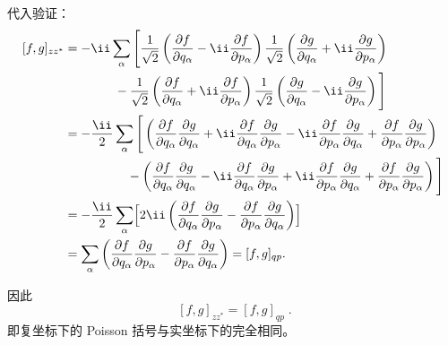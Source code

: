 \begin{question}
\begin{solution}
代入验证：
\[
\begin{aligned}
[f,g]_{zz^*}
&= -\ii\sum_{\alpha}\Bigg[
\frac{1}{\sqrt2}\left(\frac{\partial f}{\partial q_\alpha}
-\ii\frac{\partial f}{\partial p_\alpha}\right)
\frac{1}{\sqrt2}\left(\frac{\partial g}{\partial q_\alpha}
+\ii\frac{\partial g}{\partial p_\alpha}\right) \\
&\qquad\qquad
-\frac{1}{\sqrt2}\left(\frac{\partial f}{\partial q_\alpha}
+\ii\frac{\partial f}{\partial p_\alpha}\right)
\frac{1}{\sqrt2}\left(\frac{\partial g}{\partial q_\alpha}
-\ii\frac{\partial g}{\partial p_\alpha}\right)
\Bigg] \\
&= -\frac{\ii}{2}\sum_{\alpha}\Bigg[
\left(\frac{\partial f}{\partial q_\alpha}\frac{\partial g}{\partial q_\alpha}
+\ii\frac{\partial f}{\partial q_\alpha}\frac{\partial g}{\partial p_\alpha}
-\ii\frac{\partial f}{\partial p_\alpha}\frac{\partial g}{\partial q_\alpha}
+\frac{\partial f}{\partial p_\alpha}\frac{\partial g}{\partial p_\alpha}\right) \\
&\qquad\qquad\quad
-\left(\frac{\partial f}{\partial q_\alpha}\frac{\partial g}{\partial q_\alpha}
-\ii\frac{\partial f}{\partial q_\alpha}\frac{\partial g}{\partial p_\alpha}
+\ii\frac{\partial f}{\partial p_\alpha}\frac{\partial g}{\partial q_\alpha}
+\frac{\partial f}{\partial p_\alpha}\frac{\partial g}{\partial p_\alpha}\right)
\Bigg] \\
&= -\frac{\ii}{2}\sum_{\alpha}
\Bigl[2\ii\left(
\frac{\partial f}{\partial q_\alpha}\frac{\partial g}{\partial p_\alpha}
-\frac{\partial f}{\partial p_\alpha}\frac{\partial g}{\partial q_\alpha}
\right)\Bigr] \\
&= \sum_{\alpha}\left(
\frac{\partial f}{\partial q_\alpha}\frac{\partial g}{\partial p_\alpha}
-\frac{\partial f}{\partial p_\alpha}\frac{\partial g}{\partial q_\alpha}
\right) = [f,g]_{qp}.
\end{aligned}
\]

因此
\[
\boxed{\;[f,g]_{zz^*}=[f,g]_{qp}\;}.
\]
即复坐标下的 Poisson 括号与实坐标下的完全相同。
\end{solution}
\end{question}

